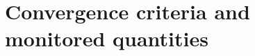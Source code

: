 \section{Convergence criteria and monitored quantities}
\label{sec:numerical-framework:convergence}

